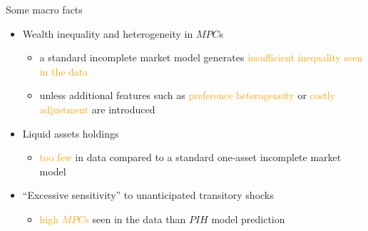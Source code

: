 \documentclass{beamer}
\begin{document}
\begin{frame}{Some macro facts}
	\begin{itemize}
	\item Wealth inequality and heterogeneity in $MPC$s
	\begin{itemize}
		\item a standard incomplete market model generates \textcolor{orange}{insufficient inequality seen in the data}
		\item unless additional features such as \textcolor{orange}{preference heterogeneity} or \textcolor{orange}{costly adjustment} are introduced 
	\end{itemize}
\item Liquid assets holdings 
\begin{itemize}
	\item \textcolor{orange}{too few} in data compared to a standard one-asset incomplete market model 
\end{itemize}
\item ``Excessive sensitivity'' to unanticipated transitory shocks 
\begin{itemize}
	\item  \textcolor{orange}{high $MPC$s} seen in the data than $PIH$ model prediction 
\end{itemize}
	\end{itemize}
\end{frame}
\end{document}
